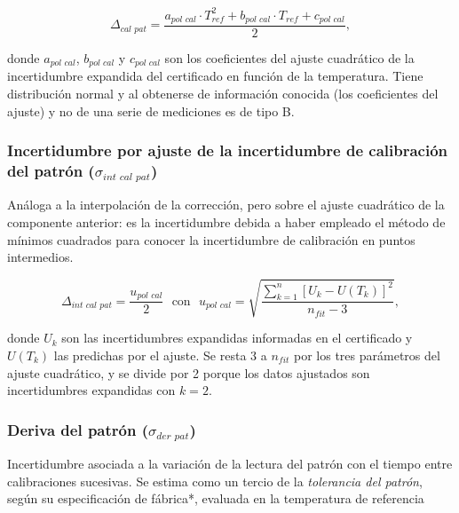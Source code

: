 \begin{equation}
    \Delta_{\textit{cal pat}} = \frac{a_{\textit{pol cal}}\cdot T_{ref}^2 + b_{\textit{pol cal}}\cdot T_{ref} + c_{\textit{pol cal}}}{2},
\end{equation}

donde $a_{\textit{pol cal}}$, $b_{\textit{pol cal}}$ y $c_{\textit{pol cal}}$ son los coeficientes del ajuste cuadrático de la incertidumbre expandida del certificado en función de la temperatura. Tiene distribución normal y al obtenerse de información conocida (los coeficientes del ajuste) y no de una serie de mediciones es de tipo B.


\subsubsection{Incertidumbre por ajuste de la incertidumbre de calibración del patrón ($\sigma_{\textit{int cal pat}}$)}

Análoga a la interpolación de la corrección, pero sobre el ajuste cuadrático de la componente anterior: es la incertidumbre debida a haber empleado el método de mínimos cuadrados para conocer la incertidumbre de calibración en puntos intermedios.

\begin{equation}
    \Delta_{\textit{int cal pat}} = \frac{u_{\textit{pol cal}}}{2} \ \ \ \text{con} \ \ \ u_{\textit{pol cal}} = \sqrt{\frac{\sum_{k=1}^{n}\left[ U_k - U(T_k) \right]^2}{n_{fit}-3}},
\end{equation}

donde $U_k$ son las incertidumbres expandidas informadas en el certificado y $U(T_k)$ las predichas por el ajuste. Se resta 3 a $n_{fit}$ por los tres parámetros del ajuste cuadrático, y se divide por 2 porque los datos ajustados son incertidumbres expandidas con $k=2$.


\subsubsection{Deriva del patrón ($\sigma_{\textit{der pat}}$)}

Incertidumbre asociada a la variación de la lectura del patrón con el tiempo entre calibraciones sucesivas. Se estima como un tercio de la \textit{tolerancia del patrón}, según su especificación de fábrica*, evaluada en la temperatura de referencia

